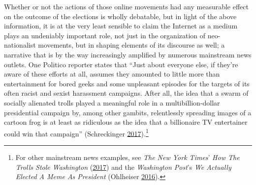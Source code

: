 \documentclass[10pt,british,A4paper,,openany]{memoir}
\begin{document}
Whether or not the actions of those online movements had any measurable
effect on the outcome of the elections is wholly debatable, but in light
of the above information, it is at the very least sensible to claim the
Internet as a medium plays an undeniably important role, not just in the
organization of neo-nationalist movements, but in shaping elements of
its discourse as well; a narrative that is by the way increasingly
amplified by numerous mainstream news outlets. One Politico reporter
states that ``Just about everyone else, if they're aware of these
efforts at all, assumes they amounted to little more than entertainment
for bored geeks and some unpleasant episodes for the targets of its
often racist and sexist harassment campaigns. After all, the idea that a
swarm of socially alienated trolls played a meaningful role in a
multibillion-dollar presidential campaign by, among other gambits,
relentlessly spreading images of a cartoon frog is at least as
ridiculous as the idea that a billionaire TV entertainer could win that
campaign'' (Schreckinger
\protect\hyperlink{ref-schreckinger_world_2017}{2017}).\footnote{For
  other mainstream news examples, see \emph{The New York Times}'
  \emph{How The Trolls Stole Washington}
  (\protect\hyperlink{ref-hess_how_2017}{2017}) and the \emph{Washington
  Post}'s \emph{We Actually Elected A Meme As President} (Ohlheiser
  \protect\hyperlink{ref-ohlheiser_analysis_2016}{2016}).}
\end{document}
